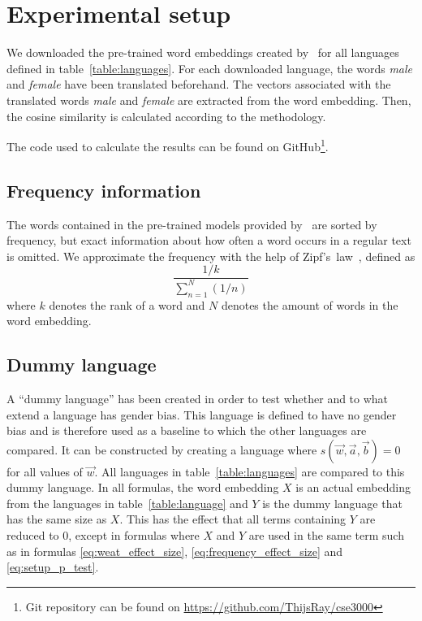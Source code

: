 \section{Experimental setup}
We downloaded the pre-trained word embeddings created
by~\textcite{grave2018learning} for all languages defined in table~\ref{table:languages}.
For each downloaded language, the words \textit{male} and \textit{female} have been
translated beforehand.
The vectors associated with the translated words \textit{male} and \textit{female} are
extracted from the word embedding. Then, the cosine similarity is calculated
according to the methodology.

The code used to calculate the results can be found on
GitHub\footnote{Git repository can be found on \url{https://github.com/ThijsRay/cse3000}}.

\subsection{Frequency information}
The words contained in the pre-trained models provided by~\textcite{grave2018learning}
are sorted by frequency, but exact information about how often a word occurs in
a regular text is omitted. We approximate the frequency with the help of
Zipf's~law~\parencite{Zipf-1935, word_embedding_zipf_context}, defined as 
\begin{equation}
    \frac{1/k}{\displaystyle\sum_{n=1}^{N}(1/n)}
\end{equation}
where $k$ denotes the rank of a word and
$N$ denotes the amount of words in the word embedding.

\subsection{Dummy language} \label{seq:dummy_language}
A ``dummy language'' has been created in order to test whether and to what extend a language has gender bias. This language is defined to have
no gender bias and is therefore used as a baseline to which the other languages
are compared.
It can be constructed by creating a language where $s(\vec{w}, \vec{a}, \vec{b}) = 0$ for all values of $\vec{w}$.
All languages in table~\ref{table:languages} are compared to this
dummy language. In all formulas, the word embedding $X$ is an actual embedding from
the languages in table~\ref{table:language} and $Y$ is
the dummy language that has the same size as $X$. This has the effect that all terms
containing $Y$ are
reduced to $0$, except in formulas where $X$ and $Y$ are used in the
same term such as in formulas
\eqref{eq:weat_effect_size}, \eqref{eq:frequency_effect_size} and \eqref{eq:setup_p_test}.


